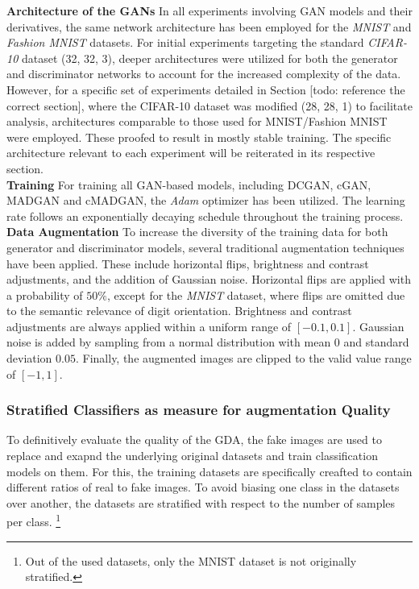 \noindent\textbf{Architecture of the GANs}
In all experiments involving GAN models and their derivatives, the same network architecture has been employed for the \textit{MNIST} and \textit{Fashion MNIST} datasets. For initial experiments targeting the standard \textit{CIFAR-10} dataset (32, 32, 3), deeper architectures were utilized for both the generator and discriminator networks to account for the increased complexity of the data. However, for a specific set of experiments detailed in Section [todo: reference the correct section], where the CIFAR-10 dataset was modified (28, 28, 1) to facilitate analysis, architectures comparable to those used for MNIST/Fashion MNIST were employed. These proofed to result in mostly stable training. The specific architecture relevant to each experiment will be reiterated in its respective section.\\

\noindent\textbf{Training}
For training all GAN-based models, including DCGAN, cGAN, MADGAN and cMADGAN, the \textit{Adam} optimizer has been utilized. The learning rate follows an exponentially decaying schedule throughout the training process.\\

\noindent\textbf{Data Augmentation}\label{body_experiment_dataaugmentation}
To increase the diversity of the training data for both generator and discriminator models, several traditional augmentation techniques have been applied. These include horizontal flips, brightness and contrast adjustments, and the addition of Gaussian noise.
Horizontal flips are applied with a probability of \(50\%\), except for the \textit{MNIST} dataset, where flips are omitted due to the semantic relevance of digit orientation. Brightness and contrast adjustments are always applied within a uniform range of \([-0.1, 0.1]\). Gaussian noise is added by sampling from a normal distribution with mean \(0\) and standard deviation \(0.05\). Finally, the augmented images are clipped to the valid value range of \([-1, 1]\).

\subsubsection{Stratified Classifiers as measure for augmentation Quality}
To definitively evaluate the quality of the GDA, the fake images are used to replace and exapnd the underlying original datasets and train classification models on them. For this, the training datasets are specifically creafted to contain different ratios of real to fake images. To avoid biasing one class in the datasets over another, the datasets are stratified with respect to the number of samples per class. \footnote{Out of the used datasets, only the MNIST dataset is not originally stratified.}

